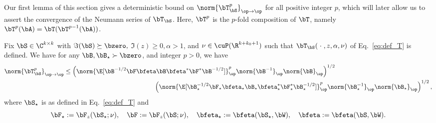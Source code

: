 Our first lemma of this section gives a deterministic bound on $\norm{\bT_\bS^p}_{\op\to\op}$ for all positive integer $p$, which will later allow us to assert the convergence of the Neumann series of $\bT_\bS$.
Here, $\bT^p$ is the $p$-fold composition of $\bT$,
namely $\bT^p(\bA) = \bT(\bT^{p-1}(\bA))$.
\begin{lemma}
\label{lemma:op_norm_bound_power_T}
Fix $\bS\in\C^{k\times k}$ with $\Im(\bS)\succeq \bzero,$ $\Im(z) \ge 0,\alpha >1$, and $\nu\in\cuP(\R^{k+k_0+1})$ such that $\bT_\bS(\;\cdot\;, z,\alpha,\nu)$ of Eq.~\eqref{eq:def_T} is defined.
We have for any
$\bB,\bB_\star \succ \bzero$,
and integer $p>0$, we have
\begin{align}
    \norm{\bT_\bS^p}_{\op \to\op}&\le 
    \left(
 \norm{\E[\bB^{-1/2} \bF\bfeta \bB\bfeta^* \bF^* \bB^{-1/2}]}_\op^p
\norm{\bB^{-1}}_\op
\norm{\bB}_\op
\right)^{1/2}
\nonumber
\\
&\hspace{5cm}\left(
 \norm{\E[\bB_\star^{-1/2} \bF_\star\bfeta_\star \bB_\star\bfeta_\star^* \bF_\star^* \bB_\star^{-1/2}]}_\op^{p}
\norm{\bB_\star^{-1}}_\op
\norm{\bB_\star}_\op
\right)^{1/2},
\nonumber
\end{align}
where $\bS_\star$ is as defined in Eq.~\eqref{eq:def_T} and 
\begin{equation}
\bF_\star := \bF_z(\bS_\star;\nu),\quad \bF:=\bF_z(\bS;\nu),\quad \bfeta_\star  :=\bfeta(\bS_\star, \bW),\quad \bfeta := \bfeta(\bS,\bW).
\end{equation}

\end{lemma}

